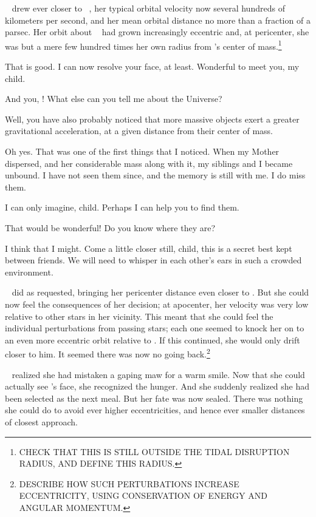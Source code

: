 \documentclass[main.tex]{subfiles}
\begin{document}
\newpara \nar \rmelectra~ drew ever closer to \rmchiron~, her typical orbital velocity now several hundreds of kilometers per second, and her mean orbital distance no more than a fraction of a parsec.  Her orbit about \rmchiron~ had grown increasingly eccentric and, at pericenter, she was but a mere few hundred times her own radius from \rmchiron's center of mass.\footnote{CHECK THAT THIS IS STILL OUTSIDE THE TIDAL DISRUPTION RADIUS, AND DEFINE THIS RADIUS.}  

\newpara \Chiron That is good.  I can now resolve your face, at least.  Wonderful to meet you, my child.

\newpara \Electra  And you, \rmchiron!  What else can you tell me about the Universe?

\newpara \Chiron Well, you have also probably noticed that more massive objects exert a greater gravitational acceleration, at a given distance from their center of mass.  

\newpara \Electra  Oh yes.  That was one of the first things that I noticed.  When my Mother dispersed, and her considerable mass along with it, my siblings and I became unbound.  I have not seen them since, and the memory is still with me.  I do miss them.

\newpara \Chiron I can only imagine, child.  Perhaps I can help you to find them.

\newpara \Electra That would be wonderful!  Do you know where they are?

\newpara \Chiron I think that I might.  Come a little closer still, child, this is a secret best kept between friends.  We will need to whisper in each other's ears in such a crowded environment.

\newpara \nar \rmelectra~ did as requested, bringing her pericenter distance even closer to \rmchiron.  But she could now feel the consequences of her decision; at apocenter, her velocity was very low relative to other stars in her vicinity.  This meant that she could feel the individual perturbations from passing stars; each one seemed to knock her on to an even more eccentric orbit relative to \rmchiron.  If this continued, she would only drift closer to him.  It seemed there was now no going back.\footnote{DESCRIBE HOW SUCH PERTURBATIONS INCREASE ECCENTRICITY, USING CONSERVATION OF ENERGY AND ANGULAR MOMENTUM.}

\newpara \nar \rmelectra~ realized she had mistaken a gaping maw for a warm smile.  Now that she could actually see \rmchiron's face, she recognized the hunger.  And she suddenly realized she had been selected as the next meal.  But her fate was now sealed.  There was nothing she could do to avoid ever higher eccentricities, and hence ever smaller distances of closest approach.  
\end{document}

